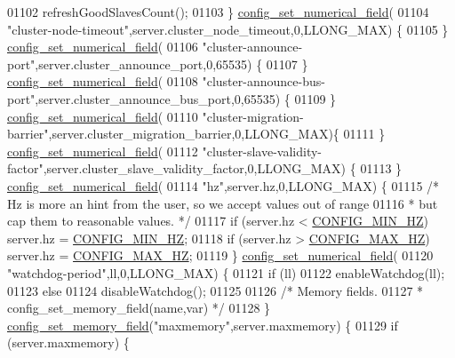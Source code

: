\begin{DoxyCode}
{{{{{{{{01102         refreshGoodSlavesCount();
01103     \} \hyperlink{config_8c_aba8f21b37a3e47952951cf4bd15ad296}{config\_set\_numerical\_field}(
01104       \textcolor{stringliteral}{"cluster-node-timeout"},server.cluster\_node\_timeout,0,LLONG\_MAX) \{
01105     \} \hyperlink{config_8c_aba8f21b37a3e47952951cf4bd15ad296}{config\_set\_numerical\_field}(
01106       \textcolor{stringliteral}{"cluster-announce-port"},server.cluster\_announce\_port,0,65535) \{
01107     \} \hyperlink{config_8c_aba8f21b37a3e47952951cf4bd15ad296}{config\_set\_numerical\_field}(
01108       \textcolor{stringliteral}{"cluster-announce-bus-port"},server.cluster\_announce\_bus\_port,0,65535) \{
01109     \} \hyperlink{config_8c_aba8f21b37a3e47952951cf4bd15ad296}{config\_set\_numerical\_field}(
01110       \textcolor{stringliteral}{"cluster-migration-barrier"},server.cluster\_migration\_barrier,0,LLONG\_MAX)\{
01111     \} \hyperlink{config_8c_aba8f21b37a3e47952951cf4bd15ad296}{config\_set\_numerical\_field}(
01112       \textcolor{stringliteral}{"cluster-slave-validity-factor"},server.cluster\_slave\_validity\_factor,0,LLONG\_MAX) \{
01113     \} \hyperlink{config_8c_aba8f21b37a3e47952951cf4bd15ad296}{config\_set\_numerical\_field}(
01114       \textcolor{stringliteral}{"hz"},server.hz,0,LLONG\_MAX) \{
01115         \textcolor{comment}{/* Hz is more an hint from the user, so we accept values out of range}
01116 \textcolor{comment}{         * but cap them to reasonable values. */}
01117         \textcolor{keywordflow}{if} (server.hz < \hyperlink{server_8h_aba98a7c0e14b8f68e19c43e3e0334fc2}{CONFIG\_MIN\_HZ}) server.hz = 
      \hyperlink{server_8h_aba98a7c0e14b8f68e19c43e3e0334fc2}{CONFIG\_MIN\_HZ};
01118         \textcolor{keywordflow}{if} (server.hz > \hyperlink{server_8h_a39e5c16e64adef2e14a9d66a725b91fd}{CONFIG\_MAX\_HZ}) server.hz = 
      \hyperlink{server_8h_a39e5c16e64adef2e14a9d66a725b91fd}{CONFIG\_MAX\_HZ};
01119     \} \hyperlink{config_8c_aba8f21b37a3e47952951cf4bd15ad296}{config\_set\_numerical\_field}(
01120       \textcolor{stringliteral}{"watchdog-period"},ll,0,LLONG\_MAX) \{
01121         \textcolor{keywordflow}{if} (ll)
01122             enableWatchdog(ll);
01123         \textcolor{keywordflow}{else}
01124             disableWatchdog();
01125 
01126     \textcolor{comment}{/* Memory fields.}
01127 \textcolor{comment}{     * config\_set\_memory\_field(name,var) */}
01128     \} \hyperlink{config_8c_ae9b891f5f43617ea158d55f449285b7d}{config\_set\_memory\_field}(\textcolor{stringliteral}{"maxmemory"},server.maxmemory) \{
01129         \textcolor{keywordflow}{if} (server.maxmemory) \{
}}}}}}}}
\end{DoxyCode}
